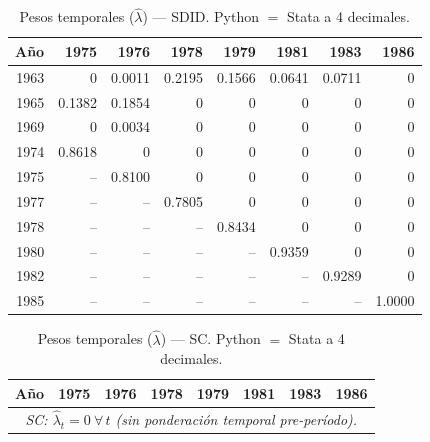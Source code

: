 \begin{table}[H]
\centering
\caption{Pesos temporales ($\hat{\lambda}$) --- SDID. Python $=$ Stata a 4 decimales.}
\label{tab:lambda_sdid}
\small
\begin{tabular}{rrrrrrrr}
\toprule
A\~{n}o & 1975 & 1976 & 1978 & 1979 & 1981 & 1983 & 1986 \\
\midrule
1963 & 0 & 0.0011 & 0.2195 & 0.1566 & 0.0641 & 0.0711 & 0 \\
1965 & 0.1382 & 0.1854 & 0 & 0 & 0 & 0 & 0 \\
1969 & 0 & 0.0034 & 0 & 0 & 0 & 0 & 0 \\
1974 & 0.8618 & 0 & 0 & 0 & 0 & 0 & 0 \\
1975 & -- & 0.8100 & 0 & 0 & 0 & 0 & 0 \\
1977 & -- & -- & 0.7805 & 0 & 0 & 0 & 0 \\
1978 & -- & -- & -- & 0.8434 & 0 & 0 & 0 \\
1980 & -- & -- & -- & -- & 0.9359 & 0 & 0 \\
1982 & -- & -- & -- & -- & -- & 0.9289 & 0 \\
1985 & -- & -- & -- & -- & -- & -- & 1.0000 \\
\bottomrule
\end{tabular}
\end{table}

\begin{table}[H]
\centering
\caption{Pesos temporales ($\hat{\lambda}$) --- SC. Python $=$ Stata a 4 decimales.}
\label{tab:lambda_sc}
\small
\begin{tabular}{rrrrrrrr}
\toprule
A\~{n}o & 1975 & 1976 & 1978 & 1979 & 1981 & 1983 & 1986 \\
\midrule
\multicolumn{8}{c}{\textit{SC: $\hat{\lambda}_t = 0\ \forall\,t$ (sin ponderaci\'on temporal pre-per\'iodo).}} \\
\bottomrule
\end{tabular}
\end{table}

